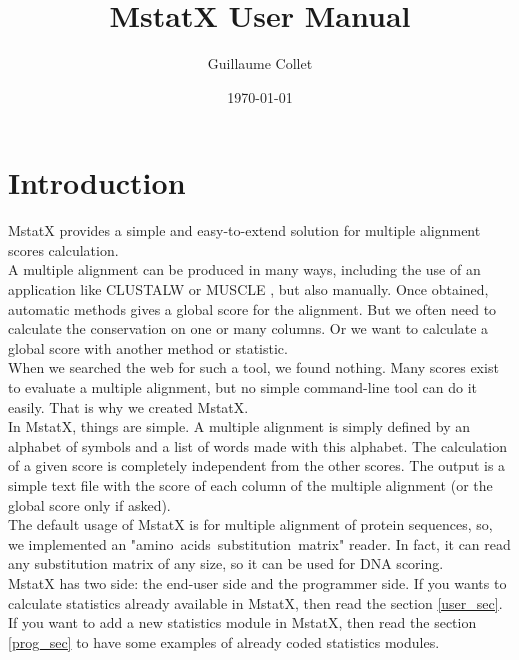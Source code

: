 \documentclass[12pt]{report}
\title{MstatX User Manual}
\author{Guillaume Collet}
\date{\today}
\begin{document}
\maketitle
\thispagestyle{empty} \newpage

\thispagestyle{empty}  \null \newpage

\setcounter{tocdepth}{3}
\tableofcontents
\thispagestyle{empty} 
\newpage

\setcounter{page}{1}
\section{Introduction}
MstatX provides a simple and easy-to-extend solution for multiple alignment scores calculation.\\

A multiple alignment can be produced in many ways, including the use of an application like CLUSTALW 
\cite{Larkin-2007} or MUSCLE \cite{Edgar0-2004}, but also manually. Once obtained, automatic methods 
gives a global score for the alignment. But we often need to calculate the conservation on one or many 
columns. Or we want to calculate a global score with another method or statistic.\\

When we searched the web for such a tool, we found nothing. Many scores exist to evaluate a multiple 
alignment, but no simple command-line tool can do it easily. That is why we created MstatX.\\

In MstatX, things are simple. A multiple alignment is simply defined by an alphabet of symbols and a list 
of words made with this alphabet. The calculation of a given score is completely independent from the 
other scores. The output is a simple text file with the score of each column of the multiple alignment (or the
global score only if asked).\\

The default usage of MstatX is for multiple alignment of protein sequences, so, we implemented an "amino~acids~substitution~matrix" reader. In fact, it can read any substitution matrix of any size, so it can
be used for DNA scoring.\\

MstatX has two side: the end-user side and the programmer side. 
If you wants to calculate statistics already available in MstatX, then read the section \ref{user_sec}. 
If you want to add a new statistics module in MstatX, then read the section \ref{prog_sec} to have some examples of
already coded statistics modules.
\end{document}
